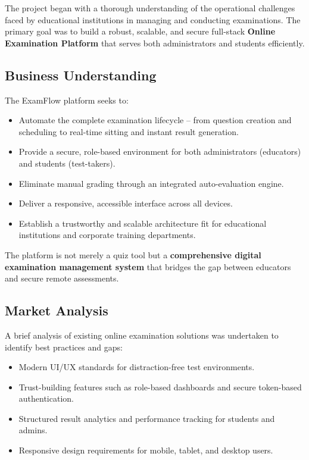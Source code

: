 \documentclass[12pt,a4paper]{article}
\begin{document}
The project began with a thorough understanding of the operational challenges faced by educational institutions in managing and conducting examinations. The primary goal was to build a robust, scalable, and secure full-stack \textbf{Online Examination Platform} that serves both administrators and students efficiently.

\subsection{Business Understanding}

The ExamFlow platform seeks to:

\begin{itemize}[leftmargin=1.5em]
  \item Automate the complete examination lifecycle -- from question creation and scheduling to real-time sitting and instant result generation.
  \item Provide a secure, role-based environment for both administrators (educators) and students (test-takers).
  \item Eliminate manual grading through an integrated auto-evaluation engine.
  \item Deliver a responsive, accessible interface across all devices.
  \item Establish a trustworthy and scalable architecture fit for educational institutions and corporate training departments.
\end{itemize}

\begin{notebox}
The platform is not merely a quiz tool but a \textbf{comprehensive digital examination management system} that bridges the gap between educators and secure remote assessments.
\end{notebox}

\subsection{Market Analysis}

A brief analysis of existing online examination solutions was undertaken to identify best practices and gaps:

\begin{itemize}[leftmargin=1.5em]
  \item Modern UI/UX standards for distraction-free test environments.
  \item Trust-building features such as role-based dashboards and secure token-based authentication.
  \item Structured result analytics and performance tracking for students and admins.
  \item Responsive design requirements for mobile, tablet, and desktop users.
\end{itemize}
\end{document}

